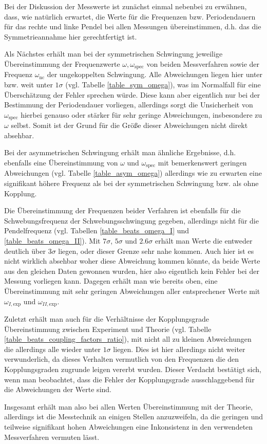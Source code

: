 \documentclass[12pt,a4paper,german]{scrartcl}
\numberwithin{equation}{section}
\begin{document}
  Bei der Diskussion der Messwerte ist zunächst einmal nebenbei zu erwähnen, dass, wie natürlich erwartet, die Werte für die Frequenzen bzw. Periodendauern für das rechte und linke Pendel bei allen Messungen übereinstimmen, d.h. das die Symmetrieannahme hier gerechtfertigt ist.

  Als Nächstes erhält man bei der symmetrischen Schwingung jeweilige Übereinstimmung der Frequenzwerte $\omega, \omega_\text{spec}$ von beiden Messverfahren sowie der Frequenz $\omega_\text{nc}$ der ungekoppelten Schwingung. Alle Abweichungen liegen hier unter bzw. weit unter $1\sigma$ (vgl. Tabelle \ref{table_sym_omega}), was im Normalfall für eine Überschätzung der Fehler sprechen würde.
  Diese kann aber eigentlich nur bei der Bestimmung der Periodendauer vorliegen, allerdings sorgt die Unsicherheit von $\omega_\text{spec}$ hierbei genauso oder stärker für sehr geringe Abweichungen, insbesondere zu $\omega$ selbst.
  Somit ist der Grund für die Größe dieser Abweichungen nicht direkt absehbar.

  Bei der asymmetrischen Schwingung erhält man ähnliche Ergebnisse, d.h. ebenfalls eine Übereinstimmung von $\omega$ und $\omega_\text{spec}$ mit bemerkenswert geringen Abweichungen (vgl. Tabelle \ref{table_asym_omega}) allerdings wie zu erwarten eine signifikant höhere Frequenz als bei der symmetrischen Schwingung bzw. als ohne Kopplung.

  Die Übereinstimmung der Frequenzen beider Verfahren ist ebenfalls für die Schwebungsfrequenz der Schwebungsschwingung gegeben, allerdings nicht für die Pendelfrequenz (vgl. Tabellen \ref{table_beats_omega_I} und \ref{table_beats_omega_II}).
  Mit $7\sigma$, $5\sigma$ und $2.6\sigma$ erhält man Werte die entweder deutlich über $3\sigma$ liegen, oder dieser Grenze sehr nahe kommen.
  Auch hier ist es nicht wirklich absehbar woher diese Abweichung kommen könnte, da beide Werte aus den gleichen Daten gewonnen wurden, hier also eigentlich kein Fehler bei der Messung vorliegen kann.
  Dagegen erhält man wie bereits oben, eine Übereinstimmung mit sehr geringen Abweichungen aller entsprechener Werte mit $\omega_{I, \text{exp}}$ und $\omega_{II, \text{exp}}$.

  Zuletzt erhält man auch für die Verhältnisse der Kopplungsgrade Übereinstimmung zwischen Experiment und Theorie (vgl. Tabelle \ref{table_beats_coupling_factors_ratio}), mit nicht all zu kleinen Abweichungen die allerdings alle wieder unter $1\sigma$ liegen.
  Dies ist hier allerdings nicht weiter verwunderlich, da dieses Verhalten vermutlich von den Frequenzen die den Kopplungsgraden zugrunde leigen vererbt wurden.
  Dieser Verdacht bestätigt sich, wenn man beobachtet, dass die Fehler der Kopplungsgrade ausschlaggebend für die Abweichungen der Werte sind.

  Insgesamt erhält man also bei allen Werten Übereinstimmung mit der Theorie, allerdings ist die Messtechnik an einigen Stellen anzuzweifeln, da die geringen und teilweise signifikant hohen Abweichungen eine Inkonsistenz in den verwendeten Messverfahren vermuten lässt.
\end{document}
